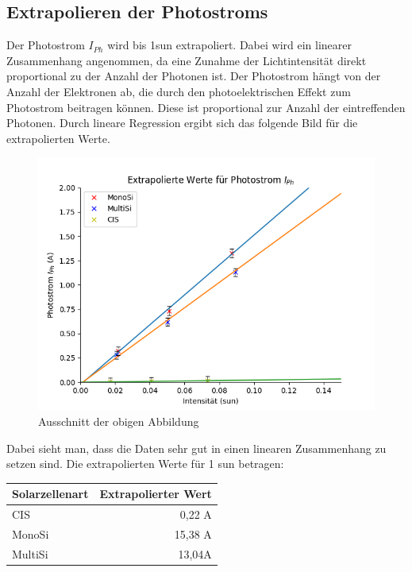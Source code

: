 \subsection{Extrapolieren der Photostroms}

Der Photostrom $I_{Ph}$ wird bis 1sun extrapoliert. Dabei wird ein linearer Zusammenhang angenommen, da eine Zunahme der Lichtintensität direkt proportional zu der 
Anzahl der Photonen ist. Der Photostrom hängt von der Anzahl der Elektronen ab, die durch den photoelektrischen Effekt zum Photostrom beitragen können. Diese ist proportional zur 
Anzahl der eintreffenden Photonen. Durch lineare Regression ergibt sich das folgende Bild für die extrapolierten Werte.
\begin{figure}[ht]
    \centering
    \includegraphics[width = 12cm]{Bilder/ExtrapolierteIPhAusschnitt.png}
    \caption{Ausschnitt der obigen Abbildung}
\end{figure} 

Dabei sieht man, dass die Daten sehr gut in einen linearen Zusammenhang zu setzen sind. Die extrapolierten Werte für 1 sun betragen:\\
\begin{center}
    \centering
    \begin{tabular}{lr}
        Solarzellenart & Extrapolierter Wert\\
        \midrule
        CIS & 0,22 A\\
        MonoSi&15,38 A\\
        MultiSi&13,04A\\
    \end{tabular}
\end{center}

